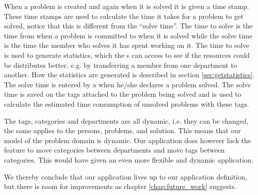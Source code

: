 When a problem is created and again when it is solved it is given a time stamp.
These time stamps are used to calculate the time it takes for a problem to get solved, notice that this is different from the ``solve time''.
The time to solve is the time from when a problem is committed to when it is solved while the solve time is the time the \astaff[] member who solves it has spent working on it.
The time to solve is used to generate statistics, which the \admin[]s can access to see if the resources could be distributes better, e.g. by transferring a \astaff[] member from one department to another.
How the statistics are generated is described in section \ref{sec:getstatistics}.
The solve time is entered by a \astaff[] when he/she declares a problem solved.
The solve time is saved on the tags attached to the problem being solved and is used to calculate the estimated time consumption of unsolved problems with these tags.

The tags, categories and departments are all dynamic, i.e. they can be changed, the same applies to the persons, problems, and solution.
This means that our model of the problem domain is dynamic.
Our application does however lack the feature to move categories between departments and move tags between categories.
This would have given an even more flexible and dynamic application.

We thereby conclude that our application lives up to our application definition, but there is room for improvements as chapter \ref{chap:future_work} suggests.











